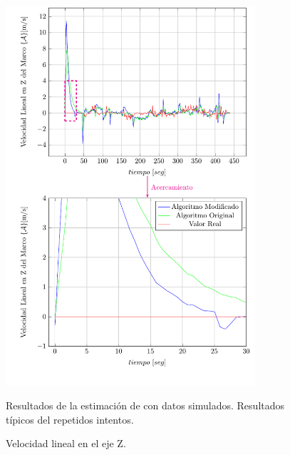 \documentclass[conference]{IEEEtran}
\begin{document}
\begin{figure}
\begin{center}
\includegraphics[width=25em]
{PlotW.pdf}
\caption{Velocidad lineal en el eje Z.}
\scriptsize{Resultados de la estimación de con datos simulados. Resultados típicos del repetidos intentos.}
\label{PlotW1}
\end{center}
\end{figure}
\newpage
\end{document}
